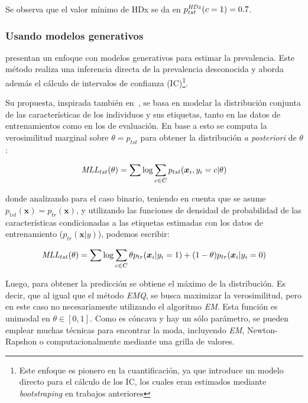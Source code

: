 Se observa que el valor mínimo de HDx se da en \(p^{\it HDx \/}_{tst}(c=1) =
0.7\).

\subsubsection{Usando modelos generativos}\label{estimacion:generativos}

\citet{keith2018uncertainty} presentan un enfoque con modelos generativos para
estimar la prevalencia. Este método realiza una inferencia directa de la
prevalencia desconocida y aborda además el cálculo de intervalos de confianza
(IC)\footnote{Este enfoque es pionero en la cuantificación, ya que introduce un
modelo directo para el cálculo de los IC, los cuales eran estimados mediante
{\it bootstraping\/} en trabajos anteriores}.

Su propuesta, inspirada también en~\citet{saerens2002adjusting}, se basa en
modelar la distribución conjunta de las características de los individuos y sus
etiquetas, tanto en las datos de entrenamientos como en los de evaluación. En
base a esto se computa la verosimilitud marginal sobre \(\theta=p_{tst}\) para
obtener la distribución {\it a posteriori\/} de \(\theta\):

\begin{equation}\label{ecuacion:mll}
    {\it MLL\/}_{tst}(\theta) = \sum {\log \sum_{c \in C}{p_{tst}(\boldsymbol{x}_i, y_i=c | \theta)}}
\end{equation}

donde analizando para el caso binario, teniendo en cuenta que se asume
\(p_{tst}(\boldsymbol{x})=p_{tr}(\boldsymbol{x})\), y utilizando las funciones
de densidad de probabilidad de las características condicionadas a las etiquetas
estimadas con los datos de entrenamiento (\(p_{tr}(\boldsymbol{x}|y)\)), podemos
escribir:

\begin{equation}\label{ecuacion:mll_bin}
    {\it MLL\/}_{tst}(\theta) = \sum {\log \sum_{c \in C}{\theta p_{tr}(\boldsymbol{x}_i | y_i=1) + (1- \theta) p_{tr}(\boldsymbol{x}_i | y_i=0)}}
\end{equation}

Luego, para obtener la predicción se obtiene el máximo de la distribución. Es
decir, que al igual que el método {\it EMQ}, se busca maximizar la
verosimilitud, pero en este caso no necesariamente utilizando el algoritmo {\it
EM}. Esta función es unimodal en \(\theta \in [0,1]\). Como es cóncava y hay un
sólo parámetro, se pueden emplear muchas técnicas para encontrar la moda,
incluyendo {\it EM}, Newton-Rapshon o computacionalmente mediante una grilla de
valores.

